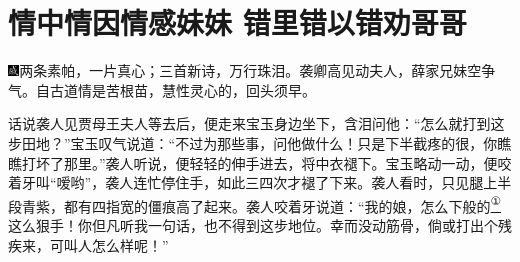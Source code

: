 

\chapter{情中情因情感妹妹 错里错以错劝哥哥}

{\includegraphics[width=3mm]{../Images/00005}两条素帕，一片真心；三首新诗，万行珠泪。袭卿高见动夫人，薛家兄妹空争气。自古道情是苦根苗，慧性灵心的，回头须早。}

话说袭人见贾母王夫人等去后，便走来宝玉身边坐下，含泪问他：``怎么就打到这步田地？''宝玉叹气说道：``不过为那些事，问他做什么！只是下半截疼的很，你瞧瞧打坏了那里。''袭人听说，便轻轻的伸手进去，将中衣褪下。宝玉略动一动，便咬着牙叫``嗳哟''，袭人连忙停住手，如此三四次才褪了下来。袭人看时，只见腿上半段青紫，都有四指宽的僵痕高了起来。袭人咬着牙说道：``我的娘，怎么下般的\href{../Text/part0038_split_000.html\#lnkback_1_a}{\textsuperscript{①}}这么狠手！你但凡听我一句话，也不得到这步地位。幸而没动筋骨，倘或打出个残疾来，可叫人怎么样呢！''

